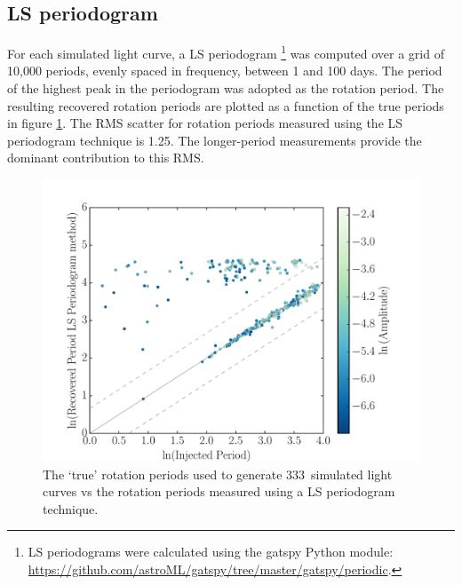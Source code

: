 \documentclass[useAMS, usenatbib, preprint, 12pt]{aastex}
\newcommand{\naigrain}{333}
\newcommand{\pgramRMS}{1.25}
\begin{document}
\subsection{LS periodogram}

For each simulated light curve, a LS periodogram
\footnote{LS periodograms were calculated using the gatspy Python module:
\url{https://github.com/astroML/gatspy/tree/master/gatspy/periodic}.}
was computed over a grid of 10,000 periods, evenly spaced in frequency,
between 1 and 100 days.
The period of the highest peak in the periodogram was adopted as the rotation
period.
The resulting recovered rotation periods are plotted as a function of the true
periods in figure \ref{fig:pgram_compare}.
The RMS scatter for rotation periods measured using the LS periodogram
technique is \pgramRMS.
The longer-period measurements provide the dominant contribution to this RMS.

\begin{figure}
\begin{center}
\includegraphics[width=6in, clip=true]{figures/compare_pgram.pdf}
\caption[LS periodogram results.]
{The `true' rotation periods used to generate \naigrain\ simulated light
curves vs the rotation periods measured using a LS periodogram technique.}
\label{fig:pgram_compare}
\end{center}
\end{figure}
\end{document}
